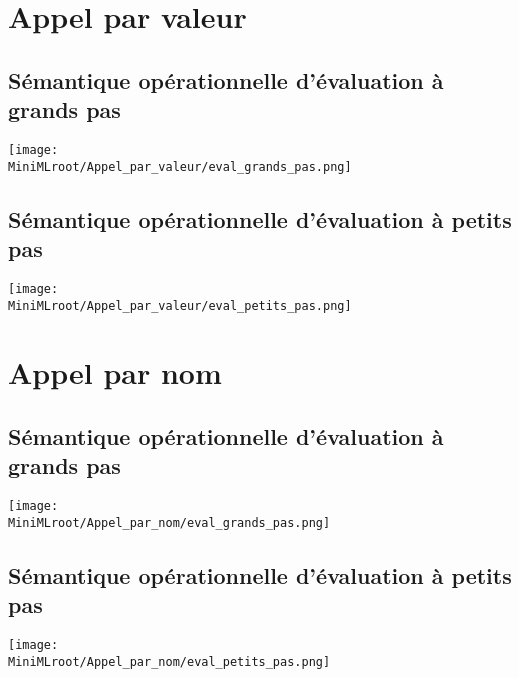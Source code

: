 



	
		\section{Appel par valeur}
		
		\subsection{Sémantique opérationnelle d’évaluation à grands pas}

\texttt{[image: \\MiniMLroot/Appel\_par\_valeur/eval\_grands\_pas.png]}		
		
		\subsection{Sémantique opérationnelle d’évaluation à petits pas}
		
\texttt{[image: \\MiniMLroot/Appel\_par\_valeur/eval\_petits\_pas.png]}		
		
		\section{Appel par nom}
		
		\subsection{Sémantique opérationnelle d’évaluation à grands pas}

\texttt{[image: \\MiniMLroot/Appel\_par\_nom/eval\_grands\_pas.png]}		
		
		\subsection{Sémantique opérationnelle d’évaluation à petits pas}

\texttt{[image: \\MiniMLroot/Appel\_par\_nom/eval\_petits\_pas.png]}